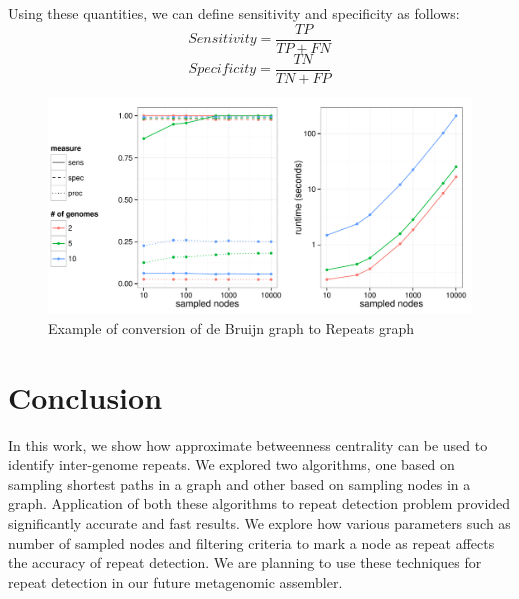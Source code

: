 \documentclass[runningheads,a4paper]{llncs}
\begin{document}
Using these quantities, we can define sensitivity and specificity as follows:
 $$Sensitivity = \frac{TP}{TP+FN}$$
 $$Specificity = \frac{TN}{TN+FP}$$


\begin{figure}[htbp]
\centering
\includegraphics[width = \textwidth]{sampled_nodes}
\caption{Example of conversion of de Bruijn graph to Repeats graph}
\label{fig:sampled_nodes}
\end{figure}

\section{Conclusion}
In this work, we show how approximate betweenness centrality can be used to identify inter-genome repeats. We explored two algorithms, one based on sampling shortest paths in a graph and other based on sampling nodes in a graph. Application of both these algorithms to repeat detection problem provided significantly accurate and fast results. We explore how various parameters such as number of sampled nodes and filtering criteria to mark a node as repeat affects the accuracy of repeat detection. We are planning to use these techniques for repeat detection in our future metagenomic assembler. 
{}

\end{document}
